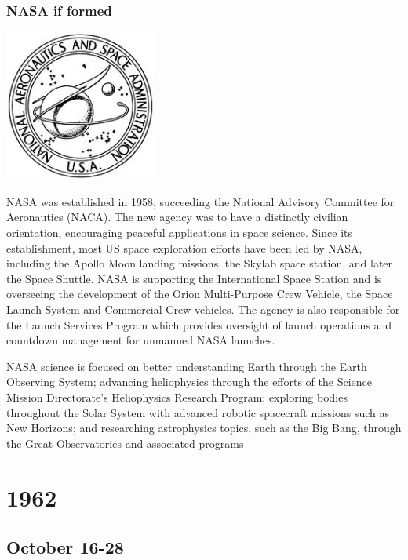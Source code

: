 \documentclass[11pt]{report}
\begin{document}
\subsection{NASA if formed}
\vspace{2mm}\begin{center}\includegraphics[width=5cm]{./img/nasa1stlogo.jpg}\end{center}
NASA was established in 1958, succeeding the National Advisory Committee for Aeronautics (NACA). The new agency was to have a distinctly civilian orientation, encouraging peaceful applications in space science. Since its establishment, most US space exploration efforts have been led by NASA, including the Apollo Moon landing missions, the Skylab space station, and later the Space Shuttle. NASA is supporting the International Space Station and is overseeing the development of the Orion Multi-Purpose Crew Vehicle, the Space Launch System and Commercial Crew vehicles. The agency is also responsible for the Launch Services Program which provides oversight of launch operations and countdown management for unmanned NASA launches.

NASA science is focused on better understanding Earth through the Earth Observing System; advancing heliophysics through the efforts of the Science Mission Directorate's Heliophysics Research Program; exploring bodies throughout the Solar System with advanced robotic spacecraft missions such as New Horizons; and researching astrophysics topics, such as the Big Bang, through the Great Observatories and associated programs

\chapter{1962}
\section{October 16-28}
\end{document}
